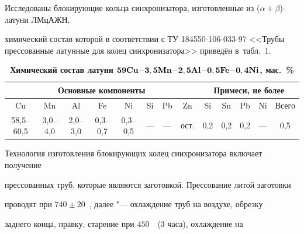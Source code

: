 Исследованы блокирующие кольца синхронизатора, изготовленные из ($\alpha {+}\beta $)-латуни ЛМцАЖН,

химический состав которой в соответствии с ТУ 184550-106-033-97 <<Трубы прессованные латунные для колец синхронизатора>> приведён в~табл.~1.



\begin{table}[b!]



\vspace{-3mm}

\small\centering

\caption{\bf Химический состав латуни $\bf 59Cu{-}3,5Mn{-}2,5Al{-}0,5Fe{-}0,4Ni$, мас.~\%}

\vspace{-3mm}

\setlength{\tabcolsep}{4pt} 

\begin{tabular}{c|c|c|c|c|c|c|c|c|c|c|c|c} \hline

\multicolumn{8}{c|}{\footnotesize Основные компоненты} & \multicolumn{5}{c}{\footnotesize Примеси, не более}  \\ 

 \hline

\footnotesize Cu & \footnotesize Mn & \footnotesize Al & \footnotesize Fe & \footnotesize Ni & \footnotesize Si & \footnotesize Pb & \footnotesize Zn & \footnotesize Si & \footnotesize Sn & \footnotesize Pb & \footnotesize Ni & \footnotesize Всего \\ \hline

\rule{0mm}{12pt}

58,5--60,5 & 3,0--4,0 & 2,0--3,0 & 0,3--0,7& 0,3--0,5    & --- & --- & ост.& 0,2& 0,2& 0,2& ---& 0,5 \\

 \hline

\end{tabular}

\end{table}



Технология изготовления блокирующих колец синхронизатора включает получение

прессованных труб, которые являются заготовкой. Прессование литой заготовки

проводят при $740\pm 20$~\textcelsius, далее "--- охлаждение труб на воздухе, обрезку

заднего конца, правку, старение при $450$~\textcelsius\ (3 часа), охлаждение на

